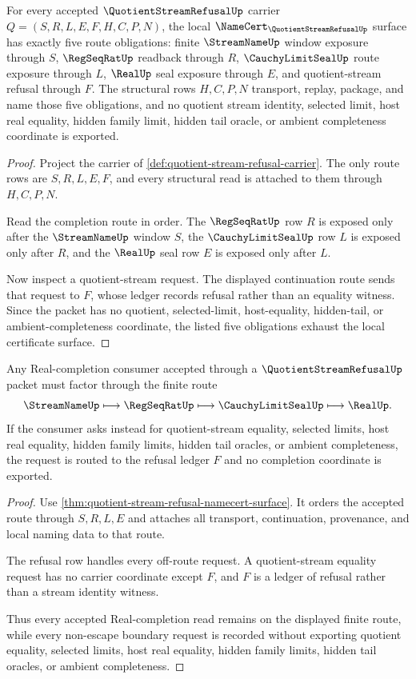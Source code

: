 \begin{theorem}
\label{thm:quotient-stream-refusal-namecert-surface}
For every accepted $\QuotientStreamRefusalUp$ carrier $Q=(S,R,L,E,F,H,C,P,N)$, the local $\NameCert_{\QuotientStreamRefusalUp}$ surface has exactly five route obligations: finite $\StreamNameUp$ window exposure through $S$, $\RegSeqRatUp$ readback through $R$, $\CauchyLimitSealUp$ route exposure through $L$, $\RealUp$ seal exposure through $E$, and quotient-stream refusal through $F$. The structural rows $H,C,P,N$ transport, replay, package, and name those five obligations, and no quotient stream identity, selected limit, host real equality, hidden family limit, hidden tail oracle, or ambient completeness coordinate is exported.
\end{theorem}
\begin{proof}
Project the carrier of \autoref{def:quotient-stream-refusal-carrier}. The only route rows are $S,R,L,E,F$, and every structural read is attached to them through $H,C,P,N$.

Read the completion route in order. The $\RegSeqRatUp$ row $R$ is exposed only after the $\StreamNameUp$ window $S$, the $\CauchyLimitSealUp$ row $L$ is exposed only after $R$, and the $\RealUp$ seal row $E$ is exposed only after $L$.

Now inspect a quotient-stream request. The displayed continuation route sends that request to $F$, whose ledger records refusal rather than an equality witness. Since the packet has no quotient, selected-limit, host-equality, hidden-tail, or ambient-completeness coordinate, the listed five obligations exhaust the local certificate surface.
\end{proof}

\begin{theorem}
\label{thm:quotient-stream-refusal-nonescape-route}
Any Real-completion consumer accepted through a $\QuotientStreamRefusalUp$ packet must factor through the finite route
$$
\StreamNameUp \longmapsto \RegSeqRatUp \longmapsto \CauchyLimitSealUp \longmapsto \RealUp.
$$
If the consumer asks instead for quotient-stream equality, selected limits, host real equality, hidden family limits, hidden tail oracles, or ambient completeness, the request is routed to the refusal ledger $F$ and no completion coordinate is exported.
\end{theorem}
\begin{proof}
Use \autoref{thm:quotient-stream-refusal-namecert-surface}. It orders the accepted route through $S,R,L,E$ and attaches all transport, continuation, provenance, and local naming data to that route.

The refusal row handles every off-route request. A quotient-stream equality request has no carrier coordinate except $F$, and $F$ is a ledger of refusal rather than a stream identity witness.

Thus every accepted Real-completion read remains on the displayed finite route, while every non-escape boundary request is recorded without exporting quotient equality, selected limits, host real equality, hidden family limits, hidden tail oracles, or ambient completeness.
\end{proof}

